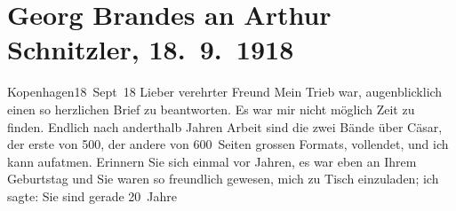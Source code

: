 

         
         \renewcommand{\erwaehntePersonen}{Personen: Georg Brandes, Gaius Iulius Caesar, Peter Nansen, Gerda Philipp, Georg Philipp, Olga Schnitzler, Lili Schnitzler, Heinrich Schnitzler}
         \renewcommand{\erwaehnteOrte}{Orte: Det Kongelige Teater, Dänemark, Kopenhagen, Skandinavien, Wien, Österreich}
         \renewcommand{\erwaehnteWerke}{Werke: Die Brüder Menthe, Gaius Julius Cæsar, Große Szene, Literatur, Stunde des Erkennens}
               \section[Georg Brandes an Arthur Schnitzler, 18. 9. 1918]{ Georg Brandes an Arthur Schnitzler, 18. 9. 1918}\nopagebreak{}\rehead{ }\begin{ledgroupsized}[t]{13cm}\normalsize\beginnumbering \toendnotes[C]{\smallbreak\pagebreak[2]} 
\toendnotes[C]{\smallbreak}\pstart
           \raggedleft{}{\pb}Kopenhagen18 Sept 18\pend
           \pstart{}Lieber verehrter Freund\pend\pstart
           Mein Trieb war, augenblicklich einen so herzlichen Brief zu beantworten. Es war mir
               nicht möglich Zeit zu finden. Endlich nach anderthalb Jahren Arbeit sind die zwei Bände über Cäsar, der erste von 500, der andere von 600 Seiten grossen Formats, vollendet, und
               ich kann aufatmen.\pend
           \pstart
           Erinnern Sie sich einmal vor Jahren, es war eben an Ihrem Geburtstag und Sie waren so
               freundlich gewesen, mich zu Tisch einzuladen; ich sagte: Sie sind gerade 20 Jahre

\end{ledgroupsized}
